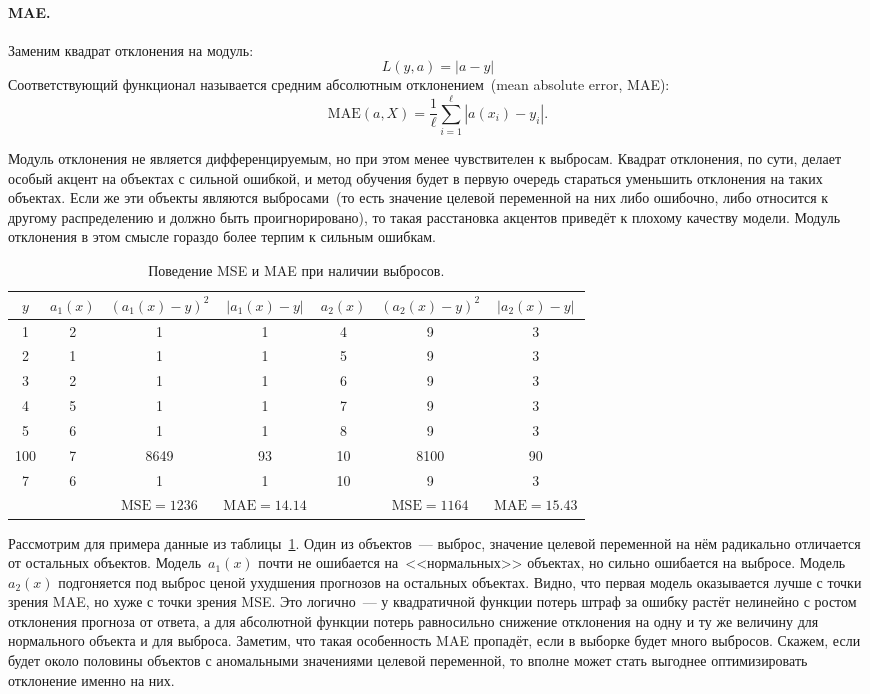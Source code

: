 \documentclass[12pt,fleqn]{article}
\begin{document}
\paragraph{MAE.}

Заменим квадрат отклонения на модуль:
\[
    L(y, a) = |a - y|
\]
Соответствующий функционал называется средним абсолютным отклонением~(mean absolute error, MAE):
\[
    \text{MAE}(a, X)
    =
    \frac{1}{\ell}
    \sum_{i = 1}^{\ell} \left|
        a(x_i) - y_i
    \right|.
\]

Модуль отклонения не является дифференцируемым, но при этом менее чувствителен к выбросам.
Квадрат отклонения, по сути, делает особый акцент на объектах с сильной ошибкой,
и метод обучения будет в первую очередь стараться уменьшить отклонения на таких объектах.
Если же эти объекты являются выбросами~(то есть значение целевой переменной на них либо ошибочно,
либо относится к другому распределению и должно быть проигнорировано),
то такая расстановка акцентов приведёт к плохому качеству модели.
Модуль отклонения в этом смысле гораздо более терпим к сильным ошибкам.

\begin{table}[t]
\label{tab:outlier}
\centering
\begin{tabular}[t]{|c||c|c|c||c|c|c|}
    \hline
    $y$ & $a_1(x)$ & $(a_1(x) - y)^2$ & $|a_1(x) - y|$ & $a_2(x)$ & $(a_2(x) - y)^2$ & $|a_2(x) - y|$  \\
    \hline
    1 & 2 & 1 & 1 & 4 & 9 & 3 \\
    2 & 1 & 1 & 1 & 5 & 9 & 3 \\
    3 & 2 & 1 & 1 & 6 & 9 & 3 \\
    4 & 5 & 1 & 1 & 7 & 9 & 3 \\
    5 & 6 & 1 & 1 & 8 & 9 & 3 \\
    {\color{red} 100} & 7 & 8649 & 93 & 10 & 8100 & 90 \\
    7 & 6 & 1 & 1 & 10 & 9 & 3 \\ \hline
      &   & $\text{MSE} = 1236$ & $\text{MAE} = 14.14$ & & $\text{MSE} = 1164$ & $\text{MAE} = 15.43$ \\
    \hline
\end{tabular}
\caption{Поведение MSE и MAE при наличии выбросов.}
\end{table}

Рассмотрим для примера данные из таблицы~\ref{tab:outlier}.
Один из объектов~--- выброс, значение целевой переменной на нём радикально отличается
от остальных объектов.
Модель~$a_1(x)$ почти не ошибается на~<<нормальных>> объектах,
но сильно ошибается на выбросе.
Модель~$a_2(x)$ подгоняется под выброс ценой ухудшения прогнозов на остальных объектах.
Видно, что первая модель оказывается лучше с точки зрения MAE, но хуже с точки зрения MSE.
Это логично~--- у квадратичной функции потерь штраф за ошибку растёт нелинейно с ростом отклонения прогноза от ответа,
а для абсолютной функции потерь равносильно снижение отклонения на одну и ту же величину для нормального объекта и для выброса.
Заметим, что такая особенность MAE пропадёт, если в выборке будет много выбросов.
Скажем, если будет около половины объектов с аномальными значениями целевой переменной, то вполне
может стать выгоднее оптимизировать отклонение именно на них.
\end{document}
